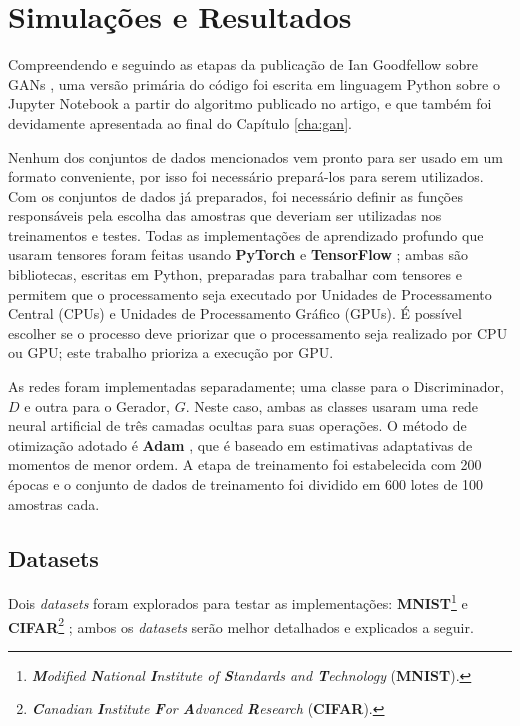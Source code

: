 \chapter{Simulações e Resultados}
\label{cha:results}

Compreendendo e seguindo as etapas da publicação de Ian Goodfellow sobre GANs \citep{NIPS2014_5423}, uma versão primária do código foi escrita em linguagem Python sobre o Jupyter Notebook a partir do algoritmo publicado no artigo, e que também foi devidamente apresentada ao final do Capítulo \ref{cha:gan}.

Nenhum dos conjuntos de dados mencionados vem pronto para ser usado em um formato conveniente, por isso foi necessário prepará-los para serem utilizados. Com os conjuntos de dados já preparados, foi necessário definir as funções responsáveis pela escolha das amostras que deveriam ser utilizadas nos treinamentos e testes. Todas as implementações de aprendizado profundo que usaram tensores foram feitas usando \textbf{PyTorch} \citep{paszke2017pytorch} e \textbf{TensorFlow} \citep{abadi2016tensorflow}; ambas são bibliotecas, escritas em Python, preparadas para trabalhar com tensores e permitem que o processamento seja executado por Unidades de Processamento Central (CPUs) e Unidades de Processamento Gráfico (GPUs). É possível escolher se o processo deve priorizar que o processamento seja realizado por CPU ou GPU; este trabalho prioriza a execução por GPU.

As redes foram implementadas separadamente; uma classe para o Discriminador, $D$ e outra para o Gerador, $G$. Neste caso, ambas as classes usaram uma rede neural artificial de três camadas ocultas para suas operações. O método de otimização adotado é \textbf{Adam} \citep{kingma2014adam}, que é baseado em estimativas adaptativas de momentos de menor ordem. A etapa de treinamento foi estabelecida com 200 épocas e o conjunto de dados de treinamento foi dividido em 600 lotes de 100 amostras cada.

\section{Datasets}
\label{sec:results_datasets}

Dois \textit{datasets} foram explorados para testar as implementações: \textbf{MNIST}\footnote{\textit{\textbf{M}odified \textbf{N}ational \textbf{I}nstitute of \textbf{S}tandards and \textbf{T}echnology} (\textbf{MNIST}).} \citep{lecun-mnisthandwrittendigit-2010} e \textbf{CIFAR}\footnote{\textit{\textbf{C}anadian \textbf{I}nstitute \textbf{F}or \textbf{A}dvanced \textbf{R}esearch} (\textbf{CIFAR}).} \citep{cifar-dataset}; ambos os \textit{datasets} serão melhor detalhados e explicados a seguir.

